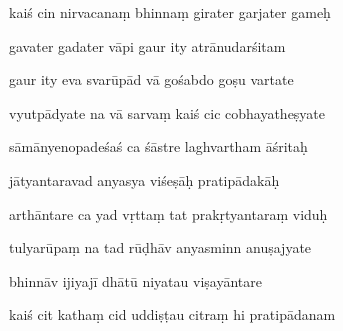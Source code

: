 \documentclass[article,12pt,a4paper]{memoir}%
\newcounter{parCount}
\begin{document}
	  
	  \pstart {} kaiś cin nirvacanaṃ bhinnaṃ girater garjater gameḥ 
	{}
	\pend%
      

	  
	  \pstart \leavevmode%
	gavater gadater vāpi gaur ity atrānudarśitam 
	{}
	\pend%
      

	  
	  \pstart {} gaur ity eva svarūpād vā gośabdo goṣu vartate 
	{}
	\pend%
      

	  
	  \pstart \leavevmode%
	vyutpādyate na vā sarvaṃ kaiś cic cobhayatheṣyate 
	{}
	\pend%
      

	  
	  \pstart {} sāmānyenopadeśaś ca śāstre laghvartham āśritaḥ 
	{}
	\pend%
      

	  
	  \pstart \leavevmode%
	jātyantaravad anyasya viśeṣāḥ pratipādakāḥ 
	{}
	\pend%
      

	  
	  \pstart {} arthāntare ca yad vṛttaṃ tat prakṛtyantaraṃ viduḥ 
	{}
	\pend%
      

	  
	  \pstart \leavevmode%
	tulyarūpaṃ na tad rūḍhāv anyasminn anuṣajyate 
	{}
	\pend%
      

	  
	  \pstart {} bhinnāv ijiyajī dhātū niyatau viṣayāntare 
	{}
	\pend%
      

	  
	  \pstart \leavevmode%
	kaiś cit kathaṃ cid uddiṣṭau citraṃ hi pratipādanam 
	{}
	\pend%
      
\end{document}
